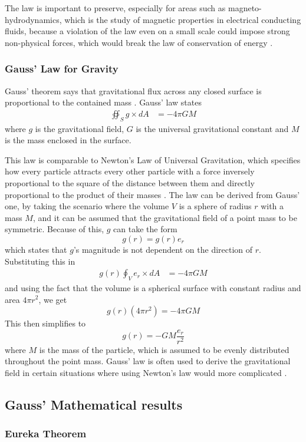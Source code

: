 \documentclass{article}
\begin{document}
The law is important to preserve, especially for areas such as magneto-hydrodynamics, which is the study of magnetic properties in electrical conducting fluids, because a violation of the law even on a small scale could impose strong non-physical forces, which would break the law of conservation of energy \cite{conservation}. 

\subsubsection{Gauss' Law for Gravity}
Gauss' theorem says that gravitational flux across any closed surface is proportional to the contained mass \cite{gravity}. Gauss’ law states 
\begin{align*}
    \oiint_{S}g\times dA &= -4\pi GM
\end{align*}
where \(g\) is the gravitational field, \(G\) is the universal gravitational constant and \(M\) is the mass enclosed in the surface. 

This law is comparable to Newton's Law of Universal Gravitation, which specifies how every particle attracts every other particle with a force inversely proportional to the square of the distance between them and directly proportional to the product of their masses \cite{gravity}. The law can be derived from Gauss' one, by taking the scenario where the volume \(V\) is a sphere of radius \(r\) with a mass \(M\), and it can be assumed that the gravitational field of a point mass to be symmetric. Because of this, \(g\) can take the form \[g(r)= g(r)e_r\] which states that \(g\)'s magnitude is not dependent on the direction of \(r\). Substituting this in
\begin{align*}
    g(r)\oint_{V}e_r\times dA &= -4\pi GM
\end{align*}
and using the fact that the volume is a spherical surface with constant radius and area \(4\pi r^2\), we get \[g(r)(4\pi r^2)=-4\pi GM\] This then simplifies to \[g(r) = -GM \frac{e_r}{r^2}\] where \(M\) is the mass of the particle, which is assumed to be evenly distributed throughout the point mass. Gauss’ law is often used to derive the gravitational field in certain situations where using Newton’s law would more complicated \cite{gravity}.

\subsection{Gauss' Mathematical results}

\subsubsection{Eureka Theorem}
\end{document}
